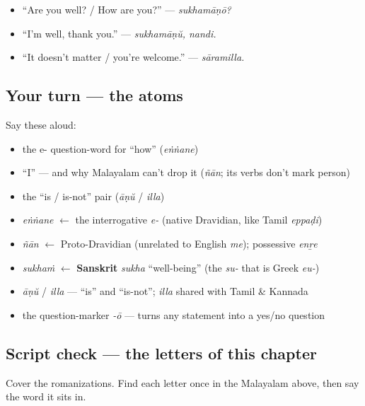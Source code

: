 \begin{itemize}
\raggedright
  \item \textquotedblleft{}Are you well? / How are you?\textquotedblright{} — \emph{sukhamāṇō?}
  \item \textquotedblleft{}I'm well, thank you.\textquotedblright{} — \emph{sukhamāṇŭ, nandi.}
  \item \textquotedblleft{}It doesn't matter / you're welcome.\textquotedblright{} — \emph{sāramilla.}
\end{itemize}

\subsection*{Your turn — the atoms}
Say these aloud:

\begin{itemize}
\raggedright
  \item the e- question-word for \textquotedblleft{}how\textquotedblright{} (\emph{eṅṅane})
  \item \textquotedblleft{}I\textquotedblright{} — and why Malayalam can't drop it (\emph{ñān}; its verbs don't mark person)
  \item the \textquotedblleft{}is / is-not\textquotedblright{} pair (\emph{āṇŭ} / \emph{illa})
\end{itemize}

\begin{cousinweb}
\begin{itemize}
\raggedright
  \item \emph{eṅṅane} $\leftarrow$ the interrogative \emph{e-} (native Dravidian, like Tamil \emph{eppaḍi})
  \item \emph{ñān} $\leftarrow$ Proto-Dravidian (unrelated to English \emph{me}); possessive \emph{enṟe}
  \item \emph{sukhaṁ} $\leftarrow$ \textbf{Sanskrit} \emph{sukha} \textquotedblleft{}well-being\textquotedblright{} (the \emph{su-} that is Greek \emph{eu-})
  \item \emph{āṇŭ} / \emph{illa} — \textquotedblleft{}is\textquotedblright{} and \textquotedblleft{}is-not\textquotedblright{}; \emph{illa} shared with Tamil \& Kannada
  \item the question-marker \emph{-ō} — turns any statement into a yes/no question
\end{itemize}
\end{cousinweb}

\subsection*{Script check — the letters of this chapter}
Cover the romanizations. Find each letter once in the Malayalam above, then say the word it sits in.

